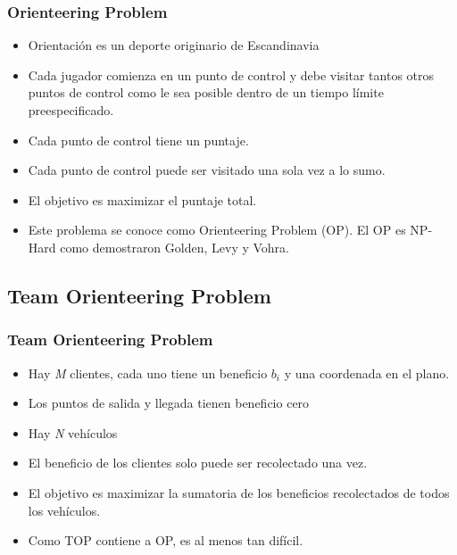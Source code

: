 \documentclass{beamer}
\begin{document}
\begin{frame}
\frametitle{Orienteering Problem}

\begin{itemize}
    \item Orientaci\'on es un deporte originario de Escandinavia
    \pause
    \item Cada jugador comienza en un punto de control y debe visitar tantos otros puntos de control como le sea posible dentro de un tiempo límite preespecificado. 
    \pause
    \item Cada punto de control tiene un puntaje.
    \pause
    \item Cada punto de control puede ser visitado una sola vez a lo sumo.
    \pause
    \item El objetivo es maximizar el puntaje total.
    \pause
    \item Este problema se conoce como Orienteering Problem (OP). El OP es NP-Hard como demostraron Golden, Levy y Vohra.
\end{itemize}

\end{frame}


\subsection{Team Orienteering Problem}
\begin{frame}
\frametitle{Team Orienteering Problem}

\begin{itemize}
    \item Hay \textit{M} clientes, cada uno tiene un beneficio $b_i$ y una coordenada en el plano.
    \pause
    \item Los puntos de salida y llegada tienen beneficio cero
    \pause    
    \item Hay \textit{N} veh\'iculos
    \pause
    \item El beneficio de los clientes solo puede ser recolectado una vez.
    \pause
    \item El objetivo es maximizar la sumatoria de los beneficios recolectados de todos los vehículos.
    \pause
    \item Como TOP contiene a OP, es al menos tan dif\'icil.
\end{itemize}

\end{frame}
\end{document}
